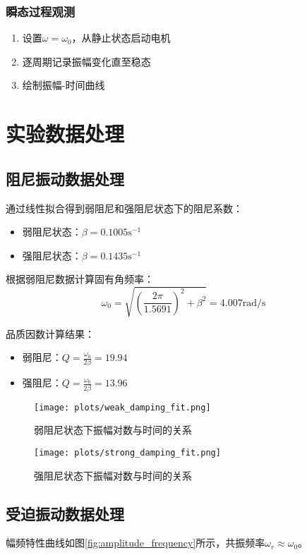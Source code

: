 \documentclass[UTF8]{ctexart}
\begin{document}
\subsubsection{瞬态过程观测}
\begin{enumerate}
\item 设置$\omega=\omega_0$，从静止状态启动电机
\item 逐周期记录振幅变化直至稳态
\item 绘制振幅-时间曲线
\end{enumerate}

\section{实验数据处理}
\subsection{阻尼振动数据处理}
通过线性拟合得到弱阻尼和强阻尼状态下的阻尼系数：
\begin{itemize}
    \item 弱阻尼状态：$\beta = 0.1005 \text{s}^{-1}$
    \item 强阻尼状态：$\beta = 0.1435 \text{s}^{-1}$
\end{itemize}

根据弱阻尼数据计算固有角频率：
\[ \omega_0 = \sqrt{\left(\frac{2\pi}{1.5691}\right)^2 + \beta^2} = 4.007 \text{rad/s} \]

品质因数计算结果：
\begin{itemize}
    \item 弱阻尼：$Q = \frac{\omega_0}{2\beta} = 19.94$
    \item 强阻尼：$Q = \frac{\omega_0}{2\beta} = 13.96$
\end{itemize}

\begin{figure}[H]
    \centering
    \texttt{[image: plots/weak\_damping\_fit.png]}
    \caption{弱阻尼状态下振幅对数与时间的关系}
    \label{fig:weak_damping}
\end{figure}

\begin{figure}[H]
    \centering
    \texttt{[image: plots/strong\_damping\_fit.png]}
    \caption{强阻尼状态下振幅对数与时间的关系}
    \label{fig:strong_damping}
\end{figure}

\subsection{受迫振动数据处理}
幅频特性曲线如图\ref{fig:amplitude_frequency}所示，共振频率$\omega_r \approx \omega_0$。
\end{document}
